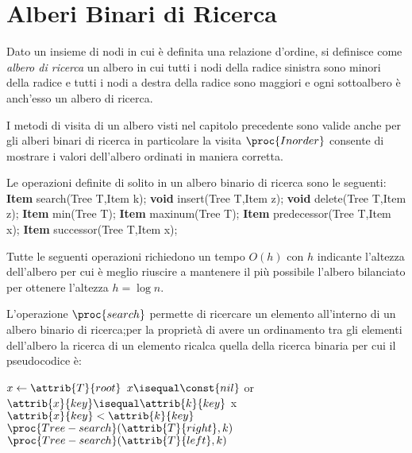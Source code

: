 \chapter{Alberi Binari di Ricerca}
Dato un insieme di nodi in cui è definita una relazione d'ordine, si definisce come
\emph{albero di ricerca} un albero in cui tutti i nodi della radice sinistra sono
minori della radice e tutti i nodi a destra della radice sono maggiori e ogni sottoalbero
è anch'esso un albero di ricerca.


I metodi di visita di un albero visti nel capitolo precedente sono valide anche
per gli alberi binari di ricerca in particolare la visita $\proc{Inorder}$ consente
di mostrare i valori dell'albero ordinati in maniera corretta.

Le operazioni definite di solito in un albero binario di ricerca sono le seguenti:
\textbf{Item} search(Tree T,Item k);\newline
\textbf{void} insert(Tree T,Item z);\newline
\textbf{void} delete(Tree T,Item z);\newline
\textbf{Item} min(Tree T);\newline
\textbf{Item} maxinum(Tree T);\newline
\textbf{Item} predecessor(Tree T,Item x);\newline
\textbf{Item} successor(Tree T,Item x);

Tutte le seguenti operazioni richiedono un tempo $O(h)$ con $h$ indicante l'altezza
dell'albero per cui è meglio riuscire a mantenere il più possibile l'albero bilanciato
per ottenere l'altezza $h = \log n$.

L'operazione $\proc{search}$ permette di ricercare un elemento all'interno di un albero
binario di ricerca;per la proprietà di avere un ordinamento tra gli elementi dell'albero
la ricerca di un elemento ricalca quella della ricerca binaria per cui il pseudocodice è:
\begin{codebox}
\li $x \gets \attrib{T}{root}$
\li \If $x \isequal \const{nil}$ or $\attrib{x}{key} \isequal \attrib{k}{key}$
    \Then
\li                    \Return x
\li \If $\attrib{x}{key} < \attrib{k}{key}$
    \Then
\li                     \Return $\proc{Tree-search}(\attrib{T}{right},k)$
\li \Else \Return $\proc{Tree-search}(\attrib{T}{left},k)$
\end{codebox}


